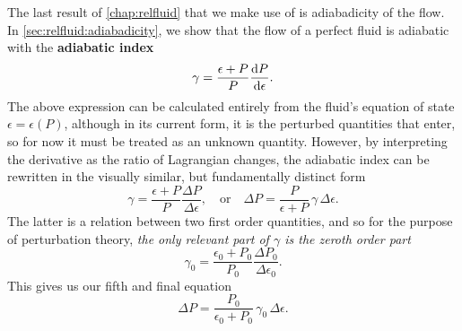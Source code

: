 The last result of \cref{chap:relfluid} that we make use of is adiabadicity of the flow.
In \cref{sec:relfluid:adiabadicity}, we show that the flow of a perfect fluid is adiabatic with the \textbf{adiabatic index}
\begin{equation}
	\gamma = \frac{\epsilon+P}{P} \odv{P}{\epsilon} .
\label{eq:nstars:adiabatic_index0}
\end{equation}
The above expression can be calculated entirely from the fluid's equation of state $\epsilon = \epsilon(P)$, although in its current form, it is the perturbed quantities that enter, so for now it must be treated as an unknown quantity.
However, by interpreting the derivative as the ratio of Lagrangian changes, the adiabatic index can be rewritten in the visually similar, but fundamentally distinct form
\begin{equation}
	\gamma = 
	\frac{\epsilon+P}{P} \frac{\Delta P}{\Delta \epsilon} ,
	\quad \text{or} \quad
	\Delta P = \frac{P}{\epsilon + P} \, \gamma \, \Delta \epsilon .
\label{eq:nstars:adiabatic_index}
\end{equation}
The latter is a relation between two first order quantities, and so for the purpose of perturbation theory, \emph{the only relevant part of $\gamma$ is the zeroth order part}
\begin{equation}
	\gamma_0 = \frac{\epsilon_0+P_0}{P_0} \frac{\Delta P_0}{\Delta \epsilon_0} .
\end{equation}
This gives us our fifth and final equation
\begin{equation}
	\Delta P = \frac{P_0}{\epsilon_0 + P_0} \, \gamma_0 \, \Delta \epsilon .
\label{eq:nstars:Delta_P}
\end{equation}

